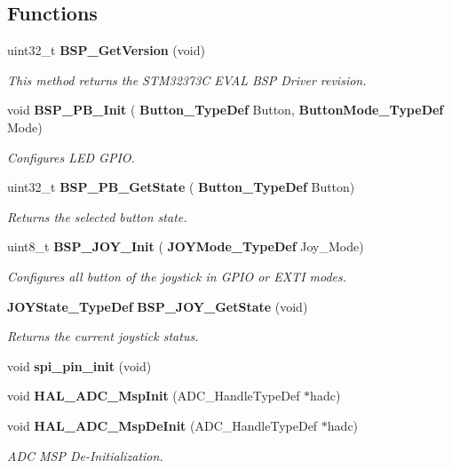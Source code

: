 \subsection*{Functions}
\begin{DoxyCompactItemize}
\item 
uint32\+\_\+t \textbf{ B\+S\+P\+\_\+\+Get\+Version} (void)
\begin{DoxyCompactList}\small\item\em This method returns the S\+T\+M32373C E\+V\+AL B\+SP Driver revision. \end{DoxyCompactList}\item 
void \textbf{ B\+S\+P\+\_\+\+P\+B\+\_\+\+Init} (\textbf{ Button\+\_\+\+Type\+Def} Button, \textbf{ Button\+Mode\+\_\+\+Type\+Def} Mode)
\begin{DoxyCompactList}\small\item\em Configures L\+ED G\+P\+IO. \end{DoxyCompactList}\item 
uint32\+\_\+t \textbf{ B\+S\+P\+\_\+\+P\+B\+\_\+\+Get\+State} (\textbf{ Button\+\_\+\+Type\+Def} Button)
\begin{DoxyCompactList}\small\item\em Returns the selected button state. \end{DoxyCompactList}\item 
uint8\+\_\+t \textbf{ B\+S\+P\+\_\+\+J\+O\+Y\+\_\+\+Init} (\textbf{ J\+O\+Y\+Mode\+\_\+\+Type\+Def} Joy\+\_\+\+Mode)
\begin{DoxyCompactList}\small\item\em Configures all button of the joystick in G\+P\+IO or E\+X\+TI modes. \end{DoxyCompactList}\item 
\textbf{ J\+O\+Y\+State\+\_\+\+Type\+Def} \textbf{ B\+S\+P\+\_\+\+J\+O\+Y\+\_\+\+Get\+State} (void)
\begin{DoxyCompactList}\small\item\em Returns the current joystick status. \end{DoxyCompactList}\item 
void \textbf{ spi\+\_\+pin\+\_\+init} (void)
\item 
void \textbf{ H\+A\+L\+\_\+\+A\+D\+C\+\_\+\+Msp\+Init} (A\+D\+C\+\_\+\+Handle\+Type\+Def $\ast$hadc)
\item 
void \textbf{ H\+A\+L\+\_\+\+A\+D\+C\+\_\+\+Msp\+De\+Init} (A\+D\+C\+\_\+\+Handle\+Type\+Def $\ast$hadc)
\begin{DoxyCompactList}\small\item\em A\+DC M\+SP De-\/\+Initialization. \end{DoxyCompactList}\end{DoxyCompactItemize}
